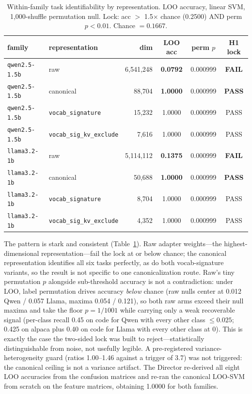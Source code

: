 \documentclass[10pt]{article}
\begin{document}
\begin{table}[ht]
\centering
\caption{Within-family task identifiability by representation. LOO
accuracy, linear SVM, 1{,}000-shuffle permutation null. Lock: acc $>$
1.5$\times$ chance (0.2500) AND perm $p < 0.01$. Chance $= 0.1667$.}
\label{tab:h1}
\begin{tabular}{llrccc}
\toprule
family & representation & dim & LOO acc & perm $p$ & H1 lock \\
\midrule
\texttt{qwen2.5-1.5b} & raw & 6{,}541{,}248 & \textbf{0.0792} & 0.000999 & \textbf{FAIL} \\
\texttt{qwen2.5-1.5b} & canonical & 88{,}704 & \textbf{1.0000} & 0.000999 & \textbf{PASS} \\
\texttt{qwen2.5-1.5b} & \texttt{vocab\_signature} & 15{,}232 & 1.0000 & 0.000999 & PASS \\
\texttt{qwen2.5-1.5b} & \texttt{vocab\_sig\_kv\_exclude} & 7{,}616 & 1.0000 & 0.000999 & PASS \\
\texttt{llama3.2-1b} & raw & 5{,}114{,}112 & \textbf{0.1375} & 0.000999 & \textbf{FAIL} \\
\texttt{llama3.2-1b} & canonical & 50{,}688 & \textbf{1.0000} & 0.000999 & \textbf{PASS} \\
\texttt{llama3.2-1b} & \texttt{vocab\_signature} & 8{,}704 & 1.0000 & 0.000999 & PASS \\
\texttt{llama3.2-1b} & \texttt{vocab\_sig\_kv\_exclude} & 4{,}352 & 1.0000 & 0.000999 & PASS \\
\bottomrule
\end{tabular}
\end{table}

The pattern is stark and consistent (Table~\ref{tab:h1}). Raw adapter
weights---the highest-dimensional representation---fail the lock at or
below chance; the canonical representation identifies all six tasks
perfectly, as do both vocab-signature variants, so the result is not
specific to one canonicalization route. Raw's tiny permutation $p$
alongside sub-threshold accuracy is not a contradiction: under LOO, label
permutation drives accuracy \emph{below} chance (raw nulls center at 0.012
Qwen / 0.057 Llama, maxima 0.054 / 0.121), so both raw arms exceed their
null maxima and take the floor $p = 1/1001$ while carrying only a weak
recoverable signal (per-class recall 0.45 on code for Qwen with every other
class $\le 0.025$; 0.425 on alpaca plus 0.40 on code for Llama with every
other class at 0). This is exactly the case the two-sided lock was built to
reject---statistically distinguishable from noise, not usefully legible. A
pre-registered variance-heterogeneity guard (ratios 1.00--1.46 against a
trigger of 3.7) was not triggered: the canonical ceiling is not a variance
artifact. The Director re-derived all eight LOO accuracies from the
confusion matrices and re-ran the canonical LOO-SVM from scratch on the
feature matrices, obtaining 1.0000 for both families.
\end{document}
